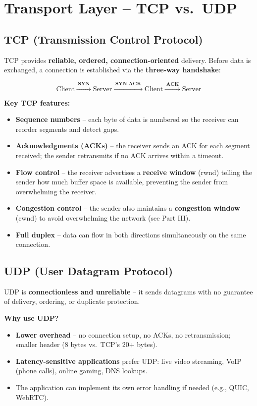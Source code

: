 \documentclass[11pt, letterpaper]{article}
\begin{document}
\section*{Transport Layer -- TCP vs.\ UDP}

\subsection*{TCP (Transmission Control Protocol)}

TCP provides \textbf{reliable, ordered, connection-oriented} delivery. Before data is exchanged, a connection is established via the \textbf{three-way handshake}:

\[
  \text{Client} \xrightarrow{\;\textbf{SYN}\;} \text{Server} \xrightarrow{\;\textbf{SYN-ACK}\;} \text{Client} \xrightarrow{\;\textbf{ACK}\;} \text{Server}
\]

\textbf{Key TCP features:}
\begin{itemize}[noitemsep]
  \item \textbf{Sequence numbers} -- each byte of data is numbered so the receiver can reorder segments and detect gaps.
  \item \textbf{Acknowledgments (ACKs)} -- the receiver sends an ACK for each segment received; the sender retransmits if no ACK arrives within a timeout.
  \item \textbf{Flow control} -- the receiver advertises a \textbf{receive window} (rwnd) telling the sender how much buffer space is available, preventing the sender from overwhelming the receiver.
  \item \textbf{Congestion control} -- the sender also maintains a \textbf{congestion window} (cwnd) to avoid overwhelming the network (see Part III).
  \item \textbf{Full duplex} -- data can flow in both directions simultaneously on the same connection.
\end{itemize}

\subsection*{UDP (User Datagram Protocol)}

UDP is \textbf{connectionless and unreliable} -- it sends datagrams with no guarantee of delivery, ordering, or duplicate protection.

\textbf{Why use UDP?}
\begin{itemize}[noitemsep]
  \item \textbf{Lower overhead} -- no connection setup, no ACKs, no retransmission; smaller header (8 bytes vs.\ TCP's 20+ bytes).
  \item \textbf{Latency-sensitive applications} prefer UDP: live video streaming, VoIP (phone calls), online gaming, DNS lookups.
  \item The application can implement its own error handling if needed (e.g., QUIC, WebRTC).
\end{itemize}
\end{document}
